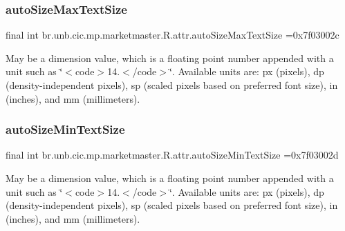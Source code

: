 \subsubsection{\texorpdfstring{auto\+Size\+Max\+Text\+Size}{autoSizeMaxTextSize}}
{\footnotesize\ttfamily final int br.\+unb.\+cic.\+mp.\+marketmaster.\+R.\+attr.\+auto\+Size\+Max\+Text\+Size =0x7f03002c\hspace{0.3cm}{\ttfamily [static]}}

May be a dimension value, which is a floating point number appended with a unit such as \char`\"{}$<$code$>$14.\+5sp$<$/code$>$\char`\"{}. Available units are\+: px (pixels), dp (density-\/independent pixels), sp (scaled pixels based on preferred font size), in (inches), and mm (millimeters). \mbox{\label{classbr_1_1unb_1_1cic_1_1mp_1_1marketmaster_1_1R_1_1attr_a42141b0e0651ccc59e4d64880f514c74}} 
\subsubsection{\texorpdfstring{auto\+Size\+Min\+Text\+Size}{autoSizeMinTextSize}}
{\footnotesize\ttfamily final int br.\+unb.\+cic.\+mp.\+marketmaster.\+R.\+attr.\+auto\+Size\+Min\+Text\+Size =0x7f03002d\hspace{0.3cm}{\ttfamily [static]}}

May be a dimension value, which is a floating point number appended with a unit such as \char`\"{}$<$code$>$14.\+5sp$<$/code$>$\char`\"{}. Available units are\+: px (pixels), dp (density-\/independent pixels), sp (scaled pixels based on preferred font size), in (inches), and mm (millimeters). \mbox{\label{classbr_1_1unb_1_1cic_1_1mp_1_1marketmaster_1_1R_1_1attr_a2bf4e99937f131ac7884511860d3cc0c}} 
